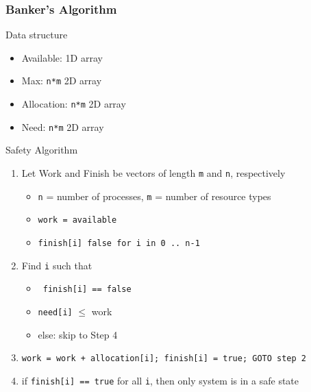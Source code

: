 \documentclass[a4paper]{article}
\begin{document}
\subsubsection{Banker's Algorithm}
Data structure
\begin{itemize}
	\item Available: 1D array
	\item Max: \texttt{n*m} 2D array
	\item Allocation: \texttt{n*m} 2D array
	\item Need: \texttt{n*m} 2D array
\end{itemize}
\noindent Safety Algorithm
\begin{enumerate}
	\item Let Work and Finish be vectors of length \texttt{m} and \texttt{n}, respectively
	\begin{itemize}[label=$\circ$]
		\item \texttt{n} = number of processes, \texttt{m} = number of resource types
		\item \texttt{work = available}
		\item \texttt{finish[i] false for i in {0 .. n-1}}
	\end{itemize}
	\item Find \texttt{i} such that
	\begin{itemize}[label=$\circ$]
		\item \texttt{ finish[i] == false}
		\item \texttt{need[i]} $\leq$ work
		\item else: skip to Step 4
	\end{itemize}
	\item \texttt{work = work + allocation[i]; finish[i] = true; GOTO step 2}
	\item if \texttt{finish[i] == true} for all \texttt{i}, then only system is in a safe state
\end{enumerate}
\end{document}
